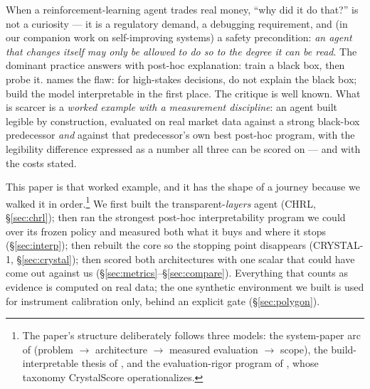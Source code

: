 \documentclass[11pt]{article}
\begin{document}
When a reinforcement-learning agent trades real money, ``why did it do that?'' is not a
curiosity --- it is a regulatory demand, a debugging requirement, and (in our companion work on
self-improving systems) a safety precondition: \emph{an agent that changes itself may only be
allowed to do so to the degree it can be read}. The dominant practice answers with post-hoc
explanation: train a black box, then probe it. \citet{rudin2019} names the flaw: for high-stakes
decisions, do not explain the black box; build the model interpretable in the first place. The
critique is well known. What is scarcer is a \emph{worked example with a measurement
discipline}: an agent built legible by construction, evaluated on real market data against a
strong black-box predecessor \emph{and} against that predecessor's own best post-hoc program,
with the legibility difference expressed as a number all three can be scored on --- and with the
costs stated.

This paper is that worked example, and it has the shape of a journey because we walked it in
order.\footnote{The paper's structure deliberately follows three models: the system-paper arc of
\citet{mnih2015} (problem $\to$ architecture $\to$ measured evaluation $\to$ scope), the
build-interpretable thesis of \citet{rudin2019}, and the evaluation-rigor program of
\citet{doshivelez2017}, whose taxonomy CrystalScore operationalizes.} We first built the
transparent-\emph{layers} agent (CHRL, \S\ref{sec:chrl}); then ran the strongest post-hoc
interpretability program we could over its frozen policy and measured both what it buys and
where it stops (\S\ref{sec:interp}); then rebuilt the core so the stopping point disappears
(CRYSTAL-1, \S\ref{sec:crystal}); then scored both architectures with one scalar that could
have come out against us (\S\ref{sec:metrics}--\S\ref{sec:compare}). Everything that counts as
evidence is computed on real data; the one synthetic environment we built is used for instrument
calibration only, behind an explicit gate (\S\ref{sec:polygon}).
\end{document}
